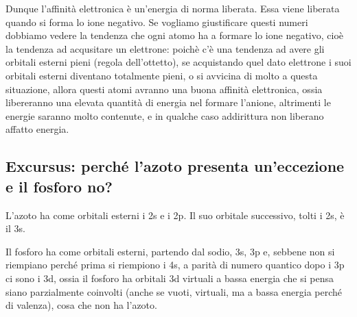 Dunque l'affinità elettronica è un'energia di norma liberata. Essa viene liberata quando si forma lo ione negativo. Se vogliamo giustificare questi numeri dobbiamo vedere la tendenza che ogni atomo ha a formare lo ione negativo, cioè la tendenza ad acqusitare un elettrone: poichè c'è una tendenza ad avere gli orbitali esterni pieni (regola dell'ottetto), se acquistando quel dato elettrone i suoi orbitali esterni diventano totalmente pieni, o si avvicina di molto a questa situazione, allora questi atomi avranno una buona affinità elettronica, ossia libereranno una elevata quantità di energia nel formare l'anione, altrimenti le energie saranno molto contenute, e in qualche caso addirittura non liberano affatto energia.
\subsection{Excursus: perché l'azoto presenta un'eccezione e il fosforo no?}
L'azoto ha come orbitali esterni i 2s e i 2p. Il suo orbitale successivo, tolti i 2s, è il 3s.

Il fosforo ha come orbitali esterni, partendo dal sodio, 3s, 3p e, sebbene non si riempiano perché prima si riempiono i 4s, a parità di numero quantico dopo i 3p ci sono i 3d, ossia il fosforo ha orbitali 3d virtuali a bassa energia che si pensa siano parzialmente coinvolti (anche se vuoti, virtuali, ma a bassa energia perché di valenza), cosa che non ha l'azoto.

